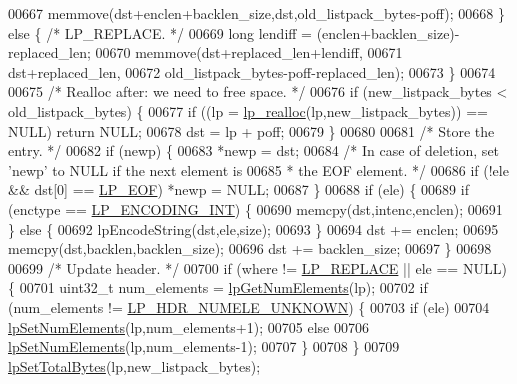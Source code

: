 \begin{DoxyCode}
{00667         memmove(dst+enclen+backlen\_size,dst,old\_listpack\_bytes-poff);
00668     \} \textcolor{keywordflow}{else} \{ \textcolor{comment}{/* LP\_REPLACE. */}
00669         \textcolor{keywordtype}{long} lendiff = (enclen+backlen\_size)-replaced\_len;
00670         memmove(dst+replaced\_len+lendiff,
00671                 dst+replaced\_len,
00672                 old\_listpack\_bytes-poff-replaced\_len);
00673     \}
00674 
00675     \textcolor{comment}{/* Realloc after: we need to free space. */}
00676     \textcolor{keywordflow}{if} (new\_listpack\_bytes < old\_listpack\_bytes) \{
00677         \textcolor{keywordflow}{if} ((lp = \hyperlink{listpack__malloc_8h_acb3fca076ed1f5c6437b4e13462bb716}{lp\_realloc}(lp,new\_listpack\_bytes)) == NULL) \textcolor{keywordflow}{return} NULL;
00678         dst = lp + poff;
00679     \}
00680 
00681     \textcolor{comment}{/* Store the entry. */}
00682     \textcolor{keywordflow}{if} (newp) \{
00683         *newp = dst;
00684         \textcolor{comment}{/* In case of deletion, set 'newp' to NULL if the next element is}
00685 \textcolor{comment}{         * the EOF element. */}
00686         \textcolor{keywordflow}{if} (!ele && dst[0] == \hyperlink{listpack_8c_aa11b422dc597c4352da2abf522692774}{LP\_EOF}) *newp = NULL;
00687     \}
00688     \textcolor{keywordflow}{if} (ele) \{
00689         \textcolor{keywordflow}{if} (enctype == \hyperlink{listpack_8c_a6f31184b7647732d04b0518b59261b62}{LP\_ENCODING\_INT}) \{
00690             memcpy(dst,intenc,enclen);
00691         \} \textcolor{keywordflow}{else} \{
00692             lpEncodeString(dst,ele,size);
00693         \}
00694         dst += enclen;
00695         memcpy(dst,backlen,backlen\_size);
00696         dst += backlen\_size;
00697     \}
00698 
00699     \textcolor{comment}{/* Update header. */}
00700     \textcolor{keywordflow}{if} (where != \hyperlink{listpack_8h_a29d3b9a55d47053582a5025dd85d7fe6}{LP\_REPLACE} || ele == NULL) \{
00701         uint32\_t num\_elements = \hyperlink{listpack_8c_a6c5657a15231eb538939e10677c8ef1f}{lpGetNumElements}(lp);
00702         \textcolor{keywordflow}{if} (num\_elements != \hyperlink{listpack_8c_aabaec596aac6d7d8370b7d801638b022}{LP\_HDR\_NUMELE\_UNKNOWN}) \{
00703             \textcolor{keywordflow}{if} (ele)
00704                 \hyperlink{listpack_8c_abd63c5b3f66f6d270759fa5e3c319ce8}{lpSetNumElements}(lp,num\_elements+1);
00705             \textcolor{keywordflow}{else}
00706                 \hyperlink{listpack_8c_abd63c5b3f66f6d270759fa5e3c319ce8}{lpSetNumElements}(lp,num\_elements-1);
00707         \}
00708     \}
00709     \hyperlink{listpack_8c_a08a4fb5c67c9c38aa657ba8773b7e1ab}{lpSetTotalBytes}(lp,new\_listpack\_bytes);
}
\end{DoxyCode}
